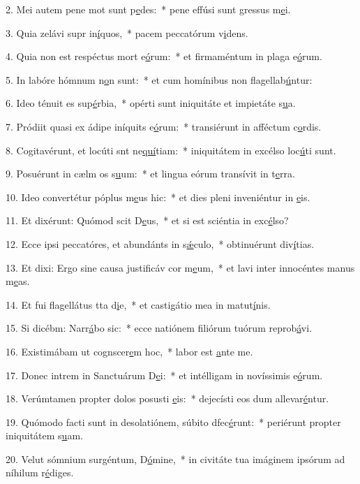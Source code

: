 2. Mei autem pene mot sunt p\uline{e}des:~* pene effúsi sunt gressus m\uline{e}i.\par 
3. Quia zelávi supr in\uline{í}quos,~* pacem peccatórum v\uline{i}dens.\par 
4. Quia non est respéctus mort e\uline{ó}rum:~* et firmaméntum in plaga e\uline{ó}rum.\par 
5. In labóre hómnum n\uline{o}n sunt:~* et cum homínibus non flagellab\uline{ú}ntur:\par 
6. Ideo ténuit es sup\uline{é}rbia,~* opérti sunt iniquitáte et impietáte s\uline{u}a.\par 
7. Pródiit quasi ex ádipe iníquits e\uline{ó}rum:~* transiérunt in afféctum c\uline{o}rdis.\par 
8. Cogitavérunt, et locúti snt ne\uline{quí}tiam:~* iniquitátem in excélso loc\uline{ú}ti sunt.\par 
9. Posuérunt in cælm os s\uline{u}um:~* et lingua eórum transívit in t\uline{e}rra.\par 
10. Ideo convertétur póplus m\uline{e}us hic:~* et dies pleni inveniéntur in \uline{e}is.\par 
11. Et dixérunt: Quómod scit D\uline{e}us,~* et si est sciéntia in exc\uline{é}lso?\par 
12. Ecce ipsi peccatóres, et abundánts in s\uline{ǽ}culo,~* obtinuérunt div\uline{í}tias.\par 
13. Et dixi: Ergo sine causa justificáv cor m\uline{e}um,~* et lavi inter innocéntes manus m\uline{e}as.\par 
14. Et fui flagellátus tta d\uline{i}e,~* et castigátio mea in matut\uline{í}nis.\par 
15. Si dicébm: Narr\uline{á}bo sic:~* ecce natiónem filiórum tuórum reprob\uline{á}vi.\par 
16. Existimábam ut cognscer\uline{e}m hoc,~* labor est \uline{a}nte me.\par 
17. Donec intrem in Sanctuárum D\uline{e}i:~* et intélligam in novíssimis e\uline{ó}rum.\par 
18. Verúmtamen propter dolos posusti \uline{e}is:~* dejecísti eos dum allevar\uline{é}ntur.\par 
19. Quómodo facti sunt in desolatiónem, súbito dfec\uline{é}runt:~* periérunt propter iniquitátem s\uline{u}am.\par 
20. Velut sómnium surgéntum, D\uline{ó}mine,~* in civitáte tua imáginem ipsórum ad níhilum r\uline{é}diges.\par 
